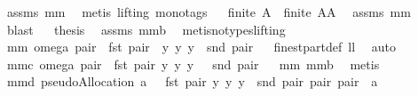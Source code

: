 \begin{isabellebody}
\ assms\ mm{}{}\ \isamarkupfalse%
\ {\isacharparenleft}metis\ {\isacharparenleft}lifting{\isacharcomma}\ mono{\isacharunderscore}tags{\isacharparenright}{\isacharparenright}\isanewline
{}\isamarkupfalse%
\ \isamarkupfalse%
\ {\isachardoublequoteopen}finite\ {\isacharquery}A\ {\isacharampersand}\ finite\ {\isacharquery}AA{\isachardoublequoteclose}\ \isamarkupfalse%
\ assms\ mm{}{}\ \isamarkupfalse%
\ blast\isanewline
{}\isamarkupfalse%
\ \isamarkupfalse%
\ {\isacharquery}thesis\ \isamarkupfalse%
\ assms\ mm{}{}b\ \isamarkupfalse%
\ {\isacharparenleft}metis{\isacharparenleft}no{\isacharunderscore}types{\isacharcomma}lifting{\isacharparenright}{\isacharparenright}\isanewline
{}\isamarkupfalse%
%
\endisatagproof
{\isafoldproof}%
%
\isadelimproof
%
\endisadelimproof
\isanewline
\isanewline
{}\isamarkupfalse%
\ mm{}{}{\isacharcolon}\ {\isachardoublequoteopen}omega\ pair\ {\isacharequal}\ {\isacharbraceleft}fst\ pair{\isacharbraceright}\ {\isasymtimes}\ {\isacharbraceleft}{\isacharbraceleft}y{\isacharbraceright}{\isacharbar}\ y{\isachardot}\ y\ {\isasymin}\ snd\ pair{\isacharbraceright}{\isachardoublequoteclose}%
\isadelimproof
\ %
\endisadelimproof
%
\isatagproof
{}\isamarkupfalse%
\ finestpart{\isacharunderscore}def\ ll{}{}\ \isamarkupfalse%
\ auto%
\endisatagproof
{\isafoldproof}%
%
\isadelimproof
%
\endisadelimproof
\isanewline
\isanewline
{}\isamarkupfalse%
\ mm{}{}c{\isacharcolon}\ {\isachardoublequoteopen}omega\ pair\ {\isacharequal}\ {\isacharbraceleft}{\isacharparenleft}fst\ pair{\isacharcomma}\ {\isacharbraceleft}y{\isacharbraceright}{\isacharparenright}{\isacharbar}\ y{\isachardot}\ y\ {\isasymin}\ \ snd\ pair{\isacharbraceright}{\isachardoublequoteclose}%
\isadelimproof
\ %
\endisadelimproof
%
\isatagproof
{}\isamarkupfalse%
\ mm{}{}\ mm{}{}b\ \isamarkupfalse%
\ metis%
\endisatagproof
{\isafoldproof}%
%
\isadelimproof
%
\endisadelimproof
\isanewline
\isanewline
{}\isamarkupfalse%
\ mm{}{}d{\isacharcolon}\ {\isachardoublequoteopen}pseudoAllocation\ a\ {\isacharequal}\ {\isasymUnion}\ {\isacharbraceleft}{\isacharbraceleft}{\isacharparenleft}fst\ pair{\isacharcomma}\ {\isacharbraceleft}y{\isacharbraceright}{\isacharparenright}{\isacharbar}\ y{\isachardot}\ y\ {\isasymin}\ snd\ pair{\isacharbraceright}{\isacharbar}\ pair{\isachardot}\ pair\ {\isasymin}\ a{\isacharbraceright}{\isachardoublequoteclose}\isanewline

\end{isabellebody}
